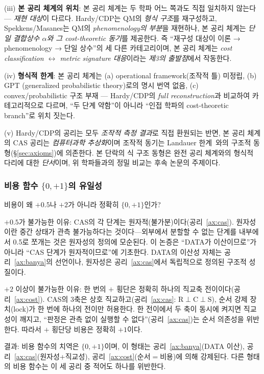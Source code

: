 \documentclass[entropy,article,submit,pdftex,oneauthor]{Definitions/mdpi}
\begin{document}
(iii) \textbf{본 공리 체계의 위치}: 본 공리 체계는 두 학파 어느 쪽과도 직접 일치하지 않는다 — \emph{재현 대상}이 다르다. Hardy/CDP는 QM의 \emph{형식 구조}를 재구성하고, Spekkens/Masanes는 QM의 \emph{phenomenology의 부분}을 재현하나, 본 공리 체계는 \emph{단일 결합상수 $\alpha$와 그 cost-theoretic 동기}를 제공한다. 즉 ``재구성 대상이 이론 → phenomenology → 단일 상수''의 세 다른 카테고리이며, 본 공리 체계는 \emph{cost classification $\leftrightarrow$ metric signature 대응}이라는 \emph{제3의 출발점}에서 작동한다.

(iv) \textbf{형식적 한계}: 본 공리 체계는 (a) operational framework(조작적 틀) 미정립, (b) GPT (generalized probabilistic theory)로의 명시 번역 없음, (c) convex/probabilistic 구조 부재 — Hardy/CDP의 \emph{full reconstruction}과 비교하여 카테고리적으로 다르며, ``두 단계 약함''이 아니라 ``인접 학파의 cost-theoretic branch''로 위치 짓는다.

(v) Hardy/CDP의 공리는 모두 \emph{조작적 측정 결과}로 직접 환원되는 반면, 본 공리 체계의 CAS 공리는 \emph{컴퓨터과학 추상화}이며 조작적 동기는 Landauer 한계~\cite{landauer1961}와의 구조적 동형(\S\ref{sec:axioms})에 의존한다. 본 단락의 식 구조 동형은 완전 공리 체계와의 형식적 다리에 대한 \emph{단서}이며, 위 학파들과의 정밀 비교는 후속 논문의 주제이다.

\subsubsection{비용 함수 $\{0, +1\}$의 유일성}

비용이 왜 $+0.5$나 $+2$가 아니라 정확히 $\{0, +1\}$인가?

$+0.5$가 불가능한 이유: CAS의 각 단계는 원자적(불가분)이다(공리~\ref{ax:cas}). 원자성이란 중간 상태가 관측 불가능하다는 것이다---외부에서 분할할 수 없는 단계를 내부에서 0.5로 쪼개는 것은 원자성의 정의에 모순된다. 이 논증은 ``DATA가 이산이므로''가 아니라 ``CAS 단계가 원자적이므로''에 기초한다. DATA의 이산성 자체는 공리~\ref{ax:banya}의 선언이나, 원자성은 공리~\ref{ax:cas}에서 독립적으로 정의된 구조적 성질이다.

$+2$ 이상이 불가능한 이유: 한 번의 $+$ 횡단은 정확히 하나의 직교축 전이이다(공리~\ref{ax:cost}). CAS의 3축은 상호 직교하고(공리~\ref{ax:cas}: $\mathrm{R} \perp \mathrm{C} \perp \mathrm{S}$), 순서 강제 장치(lock)가 한 번에 하나의 전이만 허용한다. 한 전이에서 두 축이 동시에 켜지면 직교성이 깨지고, ``판정은 관측 없이 실행할 수 없다''(공리~\ref{ax:cas})는 순서 의존성을 위반한다. 따라서 $+$ 횡단당 비용은 정확히 $+1$이다.

결과: 비용 함수의 치역은 $\{0, +1\}$이며, 이 형태는 공리~\ref{ax:banya}(DATA 이산), 공리~\ref{ax:cas}(원자성+직교성), 공리~\ref{ax:cost}(순서$=$비용)에 의해 강제된다. 다른 형태의 비용 함수는 이 세 공리 중 적어도 하나를 위반한다.
\end{document}
